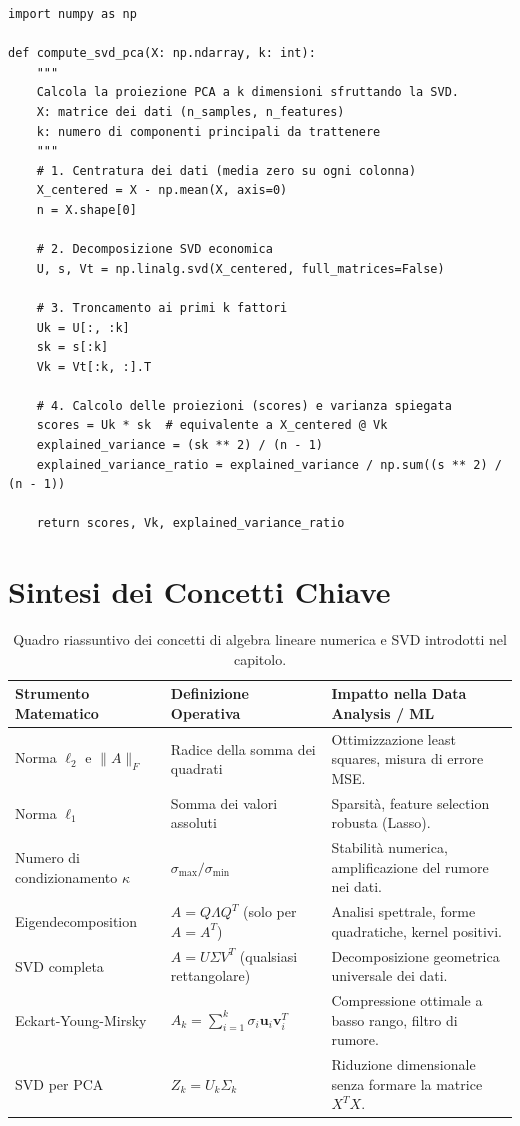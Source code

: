 \begin{lstlisting}[style=pythoncode,caption={Calcolo compatto di Truncated SVD e PCA con NumPy.}]
import numpy as np

def compute_svd_pca(X: np.ndarray, k: int):
    """
    Calcola la proiezione PCA a k dimensioni sfruttando la SVD.
    X: matrice dei dati (n_samples, n_features)
    k: numero di componenti principali da trattenere
    """
    # 1. Centratura dei dati (media zero su ogni colonna)
    X_centered = X - np.mean(X, axis=0)
    n = X.shape[0]

    # 2. Decomposizione SVD economica
    U, s, Vt = np.linalg.svd(X_centered, full_matrices=False)

    # 3. Troncamento ai primi k fattori
    Uk = U[:, :k]
    sk = s[:k]
    Vk = Vt[:k, :].T

    # 4. Calcolo delle proiezioni (scores) e varianza spiegata
    scores = Uk * sk  # equivalente a X_centered @ Vk
    explained_variance = (sk ** 2) / (n - 1)
    explained_variance_ratio = explained_variance / np.sum((s ** 2) / (n - 1))

    return scores, Vk, explained_variance_ratio
\end{lstlisting}

\FloatBarrier
\section{Sintesi dei Concetti Chiave}

\begin{table}[H]
  \centering
  \small
  \setlength{\tabcolsep}{6pt}
  \begin{tabularx}{\textwidth}{l Y Y}
    \toprule
    \textbf{Strumento Matematico} & \textbf{Definizione Operativa} & \textbf{Impatto nella Data Analysis / ML} \\
    \midrule
    Norma $\ell_2$ e $\|A\|_F$ & Radice della somma dei quadrati & Ottimizzazione least squares, misura di errore MSE. \\
    Norma $\ell_1$ & Somma dei valori assoluti & Sparsità, feature selection robusta (Lasso). \\
    Numero di condizionamento $\kappa$ & $\sigma_{\max} / \sigma_{\min}$ & Stabilità numerica, amplificazione del rumore nei dati. \\
    Eigendecomposition & $A = Q \Lambda Q^T$ (solo per $A = A^T$) & Analisi spettrale, forme quadratiche, kernel positivi. \\
    SVD completa & $A = U \Sigma V^T$ (qualsiasi rettangolare) & Decomposizione geometrica universale dei dati. \\
    Eckart-Young-Mirsky & $A_k = \sum_{i=1}^k \sigma_i \mathbf{u}_i \mathbf{v}_i^T$ & Compressione ottimale a basso rango, filtro di rumore. \\
    SVD per PCA & $Z_k = U_k \Sigma_k$ & Riduzione dimensionale senza formare la matrice $X^T X$. \\
    \bottomrule
  \end{tabularx}
  \caption{Quadro riassuntivo dei concetti di algebra lineare numerica e SVD introdotti nel capitolo.}
  \label{tab:sintesi-algebra-lineare-svd}
\end{table}
